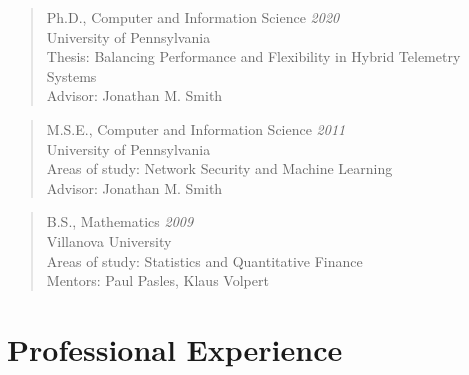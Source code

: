 \documentclass[a4paper,11pt]{article}
\begin{document}
\begin{quote}
Ph.D., Computer and Information Science \emph{2020} \\
University of Pennsylvania\\
Thesis: Balancing Performance and Flexibility in Hybrid Telemetry Systems\\
Advisor: Jonathan M. Smith\\
\end{quote}
\begin{quote}
M.S.E., Computer and Information Science \emph{2011} \\
University of Pennsylvania \\
Areas of study: Network Security and Machine Learning\\
Advisor: Jonathan M. Smith\\
\end{quote}
\begin{quote}
B.S., Mathematics \emph{2009} \\
Villanova University \\
Areas of study: Statistics and Quantitative Finance \\
Mentors: Paul Pasles, Klaus Volpert \\
\end{quote}


\section{\LARGE Professional Experience}



\end{document}
